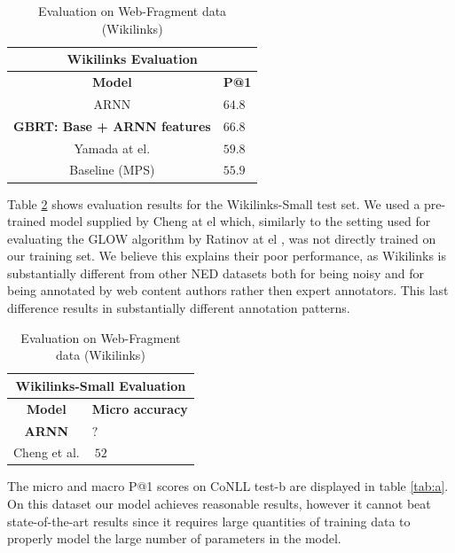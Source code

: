 \documentclass[11pt]{article}
\begin{document}
\begin{table}[h]
	\begin{center}
		\begin{tabular}{|c| p{1.5cm}|}
			\hline \multicolumn{2}{|c|}{Wikilinks Evaluation} \\
			\hline \bf Model & \bf P@1  \\ \hline
			ARNN  &                              $64.8$ \\
			\bf GBRT: Base + ARNN features & \bf $66.8$ \\
			Yamada at el. &                      $59.8$ \\
			Baseline (MPS) &                     $55.9$ \\
			\hline
		\end{tabular}
	\end{center}
	\caption{\label{tab:wikilink} Evaluation on Web-Fragment data (Wikilinks)}
\end{table}

Table \ref{tab:wikilinks-small} shows evaluation results for the Wikilinks-Small test set. We used a pre-trained model supplied by Cheng at el which, similarly to the setting used for evaluating the GLOW algorithm by Ratinov at el \cite{ratinov2011glow}, was not directly trained on our training set. We believe this explains their poor performance, as Wikilinks is substantially different from other NED datasets both for being noisy and for being annotated by web content authors rather then expert annotators. This last difference results in substantially different annotation patterns.

\begin{table}[h]
	\begin{center}
		\begin{tabular}{|c| p{1.5cm}|}
			\hline \multicolumn{2}{|c|}{Wikilinks-Small Evaluation} \\
			\hline \bf Model & \bf Micro     accuracy  \\ \hline
			\bf ARNN  &  \bf $?$ \\
			Cheng et al. & $~52$ \\
			\hline
		\end{tabular}
	\end{center}
	\caption{\label{tab:wikilinks-small} Evaluation on Web-Fragment data (Wikilinks)}
\end{table}

The micro and macro P@1 scores on CoNLL test-b are displayed in table \ref{tab:a}. On this dataset our model achieves reasonable results, however it cannot beat state-of-the-art results since it requires large quantities of training data to properly model the large number of parameters in the model. 
\end{document}
